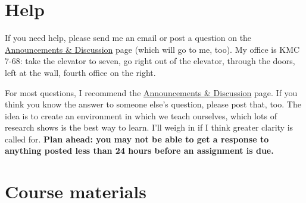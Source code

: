 \documentclass[12pt]{article}
\begin{document}
\section{Help}

If you need help, please send me an email or post a question
on the
\href{https://sites.google.com/site/nyusternglobal/home/announcements}{Announcements \& Discussion}
page (which will go to me, too).
My office is KMC 7-68:
take the elevator to seven,
go right out of the elevator, through the doors, left at the wall, fourth office on the right.

For most questions, I recommend the
\href{https://sites.google.com/site/nyusternglobal/home/announcements}{Announcements \& Discussion}
page.
If you think you know the answer to someone else's question, please post that, too.
The idea is to create an environment in which we teach ourselves,
which lots of research shows is the best way to learn.
I'll weigh in if I think greater clarity is called for.
{\bf Plan ahead:  you may not be able to get a response to anything posted
less than 24 hours before an assignment is due.}


\section{Course materials}
\end{document}
